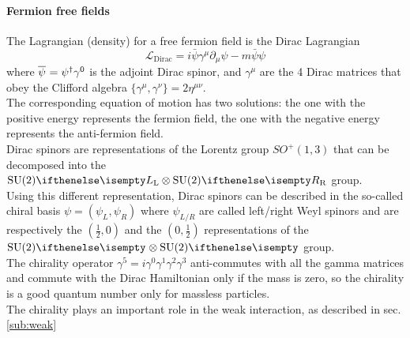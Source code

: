\paragraph*{Fermion free fields}
The Lagrangian (density) for a free fermion field is the Dirac Lagrangian
\begin{equation}\label{eq:Dirac}
\mathcal{L}_{\text{Dirac}}=i\bar{\psi}\gamma^{\mu}\partial_{\mu}\psi-m\bar{\psi}\psi
\end{equation}
where $\aff{\psi}{}=\ff{\psi}{}^\dagger\gamma^0$ is the adjoint Dirac spinor, and $\gamma^\mu$ are the 4 Dirac matrices that obey the Clifford algebra $\{\gamma^\mu,\gamma^\nu\}=2\eta^{\mu\nu}$.\\
The corresponding equation of motion has two solutions: the one with the positive energy represents the fermion field, the one with the negative energy represents the anti-fermion field.\\
Dirac spinors are representations of the Lorentz group $SO^+(1,3)$ that can be decomposed into the $\SU[L]{2} \otimes \SU[R]{2}$ group.\\
Using this different representation, Dirac spinors can be described in the so-called chiral basis $\psi=\left(\psi_L,\psi_R \right)$ where $\psi_{L/R}$ are called left/right Weyl spinors and are respectively the $\left(\frac{1}{2},0\right)$ and the $\left(0,\frac{1}{2}\right)$ representations of the $\SU{2} \otimes \SU{2}$ group.\\
The chirality operator $\gamma^5=i\gamma^0\gamma^1\gamma^2\gamma^3$ anti-commutes with all the gamma matrices and commute with the Dirac Hamiltonian only if the mass is zero, so the chirality is a good quantum number only for massless particles.\\
The chirality plays an important role in the weak interaction, as described in sec. \ref{sub:weak}
